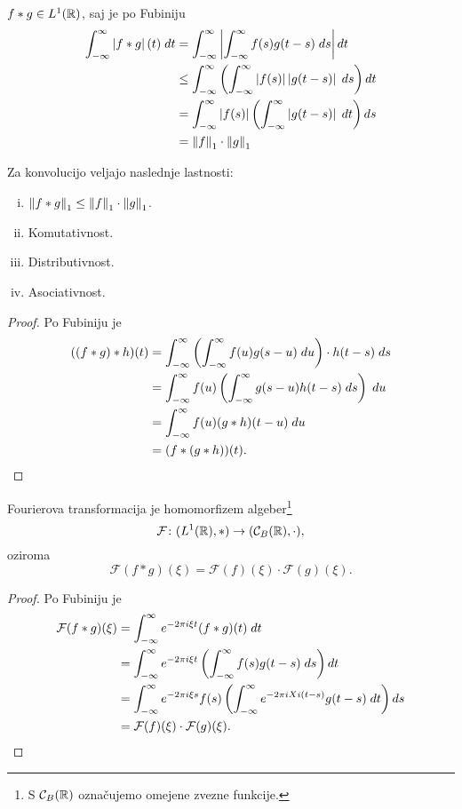 \begin{opomba}
$f * g \in L^1(\mathbb{R})$, saj je po Fubiniju
\begin{align*}
\int_{-\infty}^\infty \left\lvert f*g\right\rvert(t)\;dt &=
\int_{-\infty}^\infty
\left\lvert \int_{-\infty}^\infty f(s) g(t - s)\;ds\right\rvert dt
\\
&\leq
\int_{-\infty}^\infty \left(
\int_{-\infty}^\infty \left\lvert f(s)\right\rvert \left\lvert g(t - s)\right\rvert\;ds
\right)dt
\\
&=
\int_{-\infty}^\infty \left\lvert f(s)\right\rvert \left(
\int_{-\infty}^\infty \left\lvert g(t - s)\right\rvert\;dt
\right)ds
\\
&=
\left\lVert f\right\rVert_1 \cdot \left\lVert g\right\rVert_1
\end{align*}
\end{opomba}

\begin{trditev}
Za konvolucijo veljajo naslednje lastnosti:

\begin{enumerate}[i)]
\item $\left\lVert f*g\right\rVert_1 \leq \left\lVert f\right\rVert_1 \cdot \left\lVert g\right\rVert_1$.
\item Komutativnost.
\item Distributivnost.
\item Asociativnost.
\end{enumerate}
\end{trditev}

\begin{proof}
Po Fubiniju je
\begin{align*}
((f*g)*h)(t) &=
\int_{-\infty}^\infty \left(
\int_{-\infty}^\infty f(u) g(s - u)\;du
\right) \cdot h(t - s)\;ds
\\
&=
\int_{-\infty}^\infty f(u) \left(
\int_{-\infty}^\infty g(s - u) h(t - s)\;ds
\right)\;du
\\
&=
\int_{-\infty}^\infty f(u) (g * h)(t - u)\;du
\\
&= (f*(g*h))(t). \qedhere
\end{align*}
\end{proof}

\begin{trditev}
Fourierova transformacija je homomorfizem algeber\footnote{S
$\mathcal{C}_B(\mathbb{R})$ označujemo omejene zvezne funkcije.}
\[
\mathcal{F} \colon (L^1(\mathbb{R}),*) \to (\mathcal{C}_B(\mathbb{R}),\cdot),
\]
oziroma
\[
\mathcal{F}(f*g)(\xi) =
\mathcal{F}(f)(\xi) \cdot \mathcal{F}(g)(\xi).
\]
\end{trditev}

\begin{proof}
Po Fubiniju je
\begin{align*}
\mathcal{F}(f*g)(\xi) &=
\int_{-\infty}^\infty e^{-2 \pi i \xi t} (f*g)(t)\;dt
\\
&=
\int_{-\infty}^\infty e^{-2 \pi i \xi t} \left(
\int_{-\infty}^\infty f(s) g(t-s)\;ds
\right)dt
\\
&=
\int_{-\infty}^\infty e^{-2 \pi i \xi s} f(s) \left(
\int_{-\infty}^\infty e^{-2 \pi i Xi (t - s)} g(t-s)\;dt
\right)ds
\\
&=
\mathcal{F}(f)(\xi) \cdot \mathcal{F}(g)(\xi). \qedhere
\end{align*}
\end{proof}

